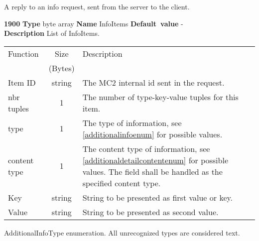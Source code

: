 \documentclass[a4paper]{article}
\begin{document}
A reply to an info request, sent from the server
to the client. 
\begin{list}{\textbf{ParamID}}{}
\item \textbf{1900} \textbf{Type} byte array \textbf{Name} InfoItems
                 \textbf{Default~value} - \\
  \label{InfoItems}
  \textbf{Description} List of InfoItems.\\
  \begin{tabular}{|l|c|p{7cm}|}
    \hline
    Function & Size    & Description \\
             & (Bytes) & \\\hline
    Item ID  & string  & The MC2 internal id sent in the request.      \\\hline
    nbr tuples& 1      & The number of type-key-value tuples for this 
                         item.\\\hline
    type     & 1       & The type of information, see \ref{additionalinfoenum} 
                         for possible values.                          \\\hline
    content type & 1   & The content type of information, see \ref{additionaldetailcontentenum} 
                         for possible values. The field shall be handled as the 
                         specified content type.                       \\\hline
    Key      & string  & String to be presented as first value or key. \\\hline
    Value    & string  & String to be presented as second value.       \\\hline
  \end{tabular}
\end{list}


\label{additionalinfoenum}
AdditionalInfoType enumeration. All unrecognized types are considered text.
\end{document}
